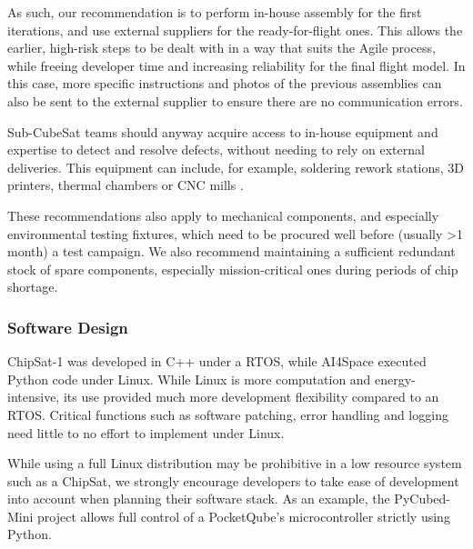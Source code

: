 \documentclass[journal,10pt]{IEEEtran}
\begin{document}

As such, our recommendation is to perform in-house assembly for the first iterations, and use external suppliers for the ready-for-flight ones. This allows the earlier, high-risk steps to be dealt with in a way that suits the Agile process, while freeing developer time and increasing reliability for the final flight model. In this case, more specific instructions and photos of the previous assemblies can also be sent to the external supplier to ensure there are no communication errors.

Sub-CubeSat teams should anyway acquire access to in-house equipment and expertise to detect and resolve defects, without needing to rely on external deliveries. This equipment can include, for example, soldering rework stations, 3D printers, thermal chambers or \acs{CNC} mills \autocite{honore-livermoreDigitalEngineeringDevelopment2022}.

These recommendations also apply to mechanical components, and especially environmental testing fixtures, which need to be procured well before (usually \textgreater1 month) a test campaign.
We also recommend maintaining a sufficient redundant stock of spare components, especially mission-critical ones during periods of chip shortage.


\subsubsection{Software Design}
ChipSat-1 was developed in C++ under a \acf{RTOS}, while AI4Space executed Python code under Linux. While Linux is more computation and energy-intensive, its use provided much more development flexibility compared to an \acs{RTOS}. Critical functions such as software patching, error handling and logging need little to no effort to implement under Linux.
 
While using a full Linux distribution may be prohibitive in a low resource system such as a ChipSat, we strongly encourage developers to take ease of development into account when planning their software stack. As an example, the PyCubed-Mini project \autocite{hollidayPyCubedOpenSourceRadiationTested2019} allows full control of a PocketQube's microcontroller strictly using Python.
\end{document}
